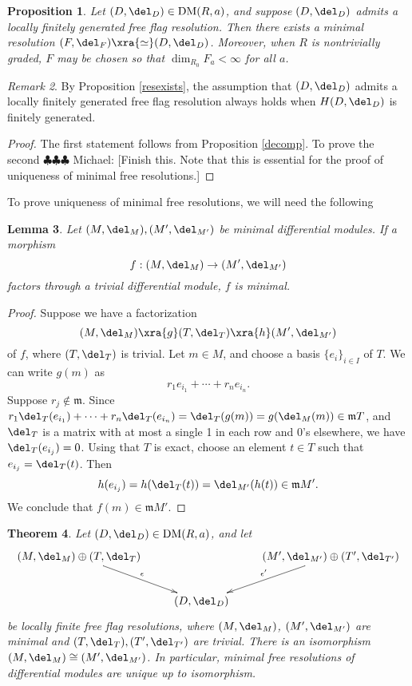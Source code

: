 \documentclass[12pt]{amsart}
\newtheorem{lemma}{Lemma}[section]
\newtheorem{prop}[lemma]{Proposition}
\newtheorem{thm}[lemma]{Theorem}
\theoremstyle{definition}
\theoremstyle{remark}
\newtheorem{rem}[lemma]{Remark}
\newcommand{\m}{\mathfrak m}
\newcommand{\michael}[1]{{\color{red} \sf $\clubsuit\clubsuit\clubsuit$ Michael: [#1]}}
\def\DM{\operatorname{DM}}
\begin{document}
\begin{prop}
\label{minresexists}
Let $(D, \del_D) \in \DM(R, a)$, and suppose $(D, \del_D)$ admits a locally finitely generated free flag resolution. Then there exists a minimal resolution $(F, \del_F) \xra{\simeq} (D, \del_D)$.
 Moreover, when $R$ is nontrivially graded, $F$ may be chosen so that $\dim_{R_0} F_a < \infty$ for all $a$. 
\end{prop}

\begin{rem}
By Proposition \ref{resexists}, the assumption that $(D, \del_D)$ admits a locally finitely generated free flag resolution always holds when $H(D, \del_D)$ is finitely generated.
\end{rem}

\begin{proof}
The first statement follows from Proposition \ref{decomp}. To prove the second \michael{Finish this. Note that this is essential for the proof of uniqueness of minimal free resolutions.}
\end{proof}

To prove uniqueness of minimal free resolutions, we will need the following

\begin{lemma}
\label{factors}
Let $(M, \del_M), (M', \del_{M'})$ be minimal differential modules. If a morphism
$$
f : (M, \del_M) \to (M', \del_{M'})
$$
factors through a trivial differential module, $f$ is minimal.
\end{lemma}

\begin{proof}
Suppose we have a factorization
$$
(M, \del_M)  \xra{g} (T, \del_T) \xra{h} (M', \del_{M'})
$$
of $f$, where $(T, \del_T)$ is trivial. Let $m \in M$, and choose a basis $\{e_i\}_{i \in I}$ of $T$. We can write $g(m)$ as
$$
r_1 e_{i_1} + \cdots + r_n e_{i_n}.
$$
Suppose $r_j \notin \m$. Since $ r_1 \del_T(e_{i_1}) + \cdots + r_n \del_T(e_{i_n}) =  \del_T(g(m)) = g(\del_M(m))  \in \m T$, and $\del_T$ is a matrix with at most a single 1 in each row and 0's elsewhere, we have $\del_T(e_{i_j}) = 0$. Using that $T$ is exact, choose an element $t \in T$ such that $e_{i_j} = \del_T(t)$. Then
$$
h(e_{i_j}) = h(\del_T(t)) = \del_{M'}(h(t)) \in \m M'.
$$
We conclude that $f(m) \in \m M'$.
\end{proof}

\begin{thm}
\label{uniqueness}
Let $(D, \del_D) \in \DM(R, a)$, and let
$$
\xymatrix{
(M, \del_M) \oplus (T, \del_T) \ar[rd]^-{\epsilon}& &  (M', \del_{M'}) \oplus (T', \del_{T'}) \ar[ld]_-{\epsilon'}\\
&(D, \del_D)&
}
$$
be locally finite free flag resolutions, where $(M, \del_M)$, $(M', \del_{M'})$ are minimal and $(T, \del_T), (T', \del_{T'})$ are trivial. There is an isomorphism $(M, \del_M) \cong (M', \del_{M'})$. In particular, minimal free resolutions of differential modules are unique up to isomorphism.
\end{thm}
\end{document}
